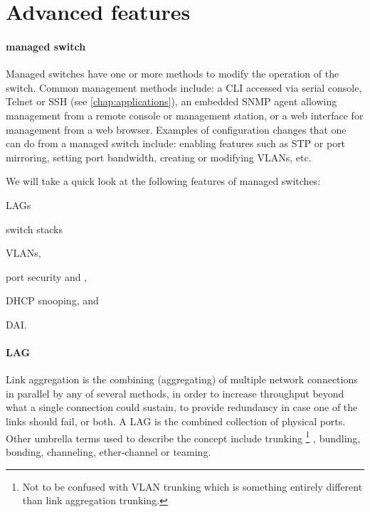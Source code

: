 \section{Advanced features}
\label{sec:ethernet-advanced-features}

\paragraph{managed switch}
\label{par:ethernet-switch-managed}
Managed switches have one or more methods to modify the operation of the switch.
Common management methods include: a \ac{CLI} accessed via serial console, Telnet or \ac{SSH} (see \vref{chap:applications}), an embedded \ac{SNMP} agent allowing management from a remote console or management station, or a web interface for management from a web browser.
Examples of configuration changes that one can do from a managed switch include: enabling features such as \ac{STP} or port mirroring, setting port bandwidth, creating or modifying \acp{VLAN}, etc.

We will take a quick look at the following features of managed switches:
\begin{inlinelist}
\item \acfp{LAG}
\item switch stacks
\item \aclp{VLAN},
\item port security and ,
\item \acs{DHCP} snooping, and
\item \acl{DAI}.
\end{inlinelist}

\paragraph{\acf{LAG}}
Link aggregation is the combining (aggregating) of multiple network connections in parallel by any of several methods, in order to increase throughput beyond what a single connection could sustain, to provide redundancy in case one of the links should fail, or both.
A \ac{LAG} is the combined collection of physical ports.
Other umbrella terms used to describe the concept include trunking%
   \footnote{Not to be confused with \acs{VLAN} trunking which is something entirely different than link aggregation trunking.}%
, bundling, bonding, channeling, ether-channel or teaming.


